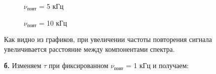 \documentclass[a4paper,12pt]{article}
\theoremstyle{definition}
\begin{document}
\begin{enumerate}
\begin{figure}[h]
\begin{minipage}[h]{0.47\linewidth}
\end{minipage}
\vfill
\begin{minipage}[h]{0.47\linewidth}
 $\nu_\text{повт}$ = 5 кГц  \\
\end{minipage}
\hfill
\begin{minipage}[h]{0.47\linewidth}
 $\nu_\text{повт}$ = 10 кГц  \\
\end{minipage}
\caption{}
\label{ris:experimentalcorrelationsignals}
\end{figure}


Как видно из графиков, при увеличении частоты повторения сигнала увеличивается расстояние между компонентами спектра.

\newpage


\textbf{б.} Изменяем $\tau$ при фиксированном $\nu_\text{повт}$ = 1 кГц и получаем:


\end{enumerate}
\end{document}
